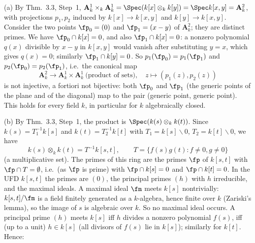 \documentclass[11pt]{article}
\begin{document}
\pf
(a) By Thm.~3.3, Step~1, $\mathbf A^1_k\times_k\mathbf A^1_k=\Spec(k[x]\otimes_kk[y])=\Spec k[x,y]=\mathbf A^2_k$, with projections $p_1,p_2$ induced by $k[x]\to k[x,y]$ and $k[y]\to k[x,y]$. Consider the two points $\fp_0=(0)$ and $\fp_1=(x-y)$ of $\mathbf A^2_k$; they are distinct primes. We have $\fp_0\cap k[x]=0$, and also $\fp_1\cap k[x]=0$: a nonzero polynomial $q(x)$ divisible by $x-y$ in $k[x,y]$ would vanish after substituting $y=x$, which gives $q(x)=0$; similarly $\fp_1\cap k[y]=0$. So $p_1(\fp_0)=p_1(\fp_1)$ and $p_2(\fp_0)=p_2(\fp_1)$, i.e.\ the canonical map
\[\mathbf A^2_k\to\mathbf A^1_k\times\mathbf A^1_k\ \text{(product of sets)},\quad z\mapsto(p_1(z),p_2(z))\]
is not injective, a fortiori not bijective: both $\fp_0$ and $\fp_1$ (the generic points of the plane and of the diagonal) map to the pair (generic point, generic point). This holds for every field $k$, in particular for $k$ algebraically closed.

(b) By Thm.~3.3, Step~1, the product is $\Spec(k(s)\otimes_kk(t))$. Since $k(s)=T_1^{-1}k[s]$ and $k(t)=T_2^{-1}k[t]$ with $T_1=k[s]\smallsetminus0$, $T_2=k[t]\smallsetminus0$, we have
\[k(s)\otimes_kk(t)=T^{-1}k[s,t],\qquad T=\{f(s)g(t):f\ne0,g\ne0\}\]
(a multiplicative set). The primes of this ring are the primes $\fp$ of $k[s,t]$ with $\fp\cap T=\emptyset$, i.e.\ (as $\fp$ is prime) with $\fp\cap k[s]=0$ and $\fp\cap k[t]=0$. In the UFD $k[s,t]$ the primes are $(0)$, the principal primes $(h)$ with $h$ irreducible, and the maximal ideals. A maximal ideal $\fm$ meets $k[s]$ nontrivially: $k[s,t]/\fm$ is a field finitely generated as a $k$-algebra, hence finite over $k$ (Zariski's lemma), so the image of $s$ is algebraic over $k$. So no maximal ideal occurs. A principal prime $(h)$ meets $k[s]$ iff $h$ divides a nonzero polynomial $f(s)$, iff (up to a unit) $h\in k[s]$ (all divisors of $f(s)$ lie in $k[s]$); similarly for $k[t]$. Hence:
\end{document}
